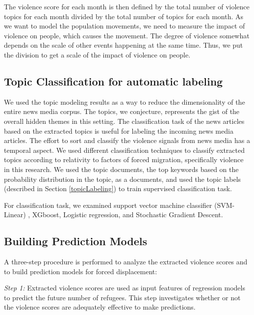 The violence score for each month is then defined by the total number of violence topics for each month divided by the total number of topics for each month. As we want to model the population movements, we need to measure the impact of violence on people, which causes the movement. The degree of violence somewhat depends on the scale of other events happening at the same time. Thus, we put the division to get a scale of the impact of violence on people.


\subsection{Topic Classification for automatic labeling}
We used the topic modeling results as a way to reduce the dimensionality of the entire news media corpus. The topics, we conjecture, represents the gist of the overall hidden themes in this setting. The classification task of the news articles based on the extracted topics is useful for labeling the incoming news media articles. The effort to sort and classify the violence signals from news media has a temporal aspect. We used different classification techniques to classify extracted topics according to relativity to factors of forced migration, specifically violence in this research. We used the topic documents, the top keywords based on the probability distribution in the topic, as a documents, and used the topic labels (described in Section \ref{topicLabeling}) to train supervised classification task. 

For classification task, we examined  support vector machine classifier (SVM-Linear) \cite{Crammer:2002:AIM:944790.944813}, XGboost\cite{DBLP:journals/corr/ChenG16}, Logistic regression, and Stochastic Gradient Descent.

\subsection{Building Prediction Models}
A three-step procedure is performed to analyze the extracted violence scores and to build prediction models for forced displacement:

\textit{Step 1:}
Extracted violence scores are used as input features of regression models to predict the future number of refugees. This step investigates whether or not the violence scores are adequately effective to make predictions. 

